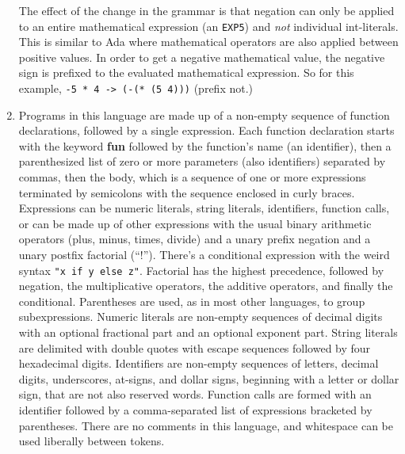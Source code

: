 \documentclass{article}
\begin{document}
\begin{enumerate}
\begin{center}

\end{center}
The effect of the change in the grammar is that negation can only be applied to an entire mathematical expression (an \texttt{EXP5}) and \textit{not} individual int-literals. This is similar to Ada where mathematical operators are also applied between positive values. In order to get a negative mathematical value, the negative sign is prefixed to the evaluated mathematical expression. So for this example, \texttt{-5 * 4 -> (-(* (5 4)))} (prefix not.)\\
\pagebreak
\item Programs in this language are made up of a non-empty sequence of function declarations, followed by a single expression. Each function declaration starts with the keyword \textbf{fun} followed by the function's name (an identifier), then a parenthesized list of zero or more parameters (also identifiers) separated by commas, then the body, which is a sequence of one or more expressions terminated by semicolons with the sequence enclosed in curly braces. Expressions can be numeric literals, string literals, identifiers, function calls, or can be made up of other expressions with the usual binary arithmetic operators (plus, minus, times, divide) and a unary prefix negation and a unary postfix factorial (``!''). There's a conditional expression with the weird syntax \texttt{"x if y else z"}. Factorial has the highest precedence, followed by negation, the multiplicative operators, the additive operators, and finally the conditional. Parentheses are used, as in most other languages, to group subexpressions. Numeric literals are non-empty sequences of decimal digits with an optional fractional part and an optional exponent part.
String literals are delimited with double quotes with escape sequences followed by four hexadecimal digits. Identifiers are non-empty sequences of letters, decimal digits, underscores, at-signs, and dollar signs, beginning with a letter or dollar sign, that are not also reserved words. Function calls are formed with an identifier followed by a comma-separated list of expressions bracketed by parentheses. There are no comments in this language, and whitespace can be used liberally between tokens.

\end{enumerate}
\end{document}
